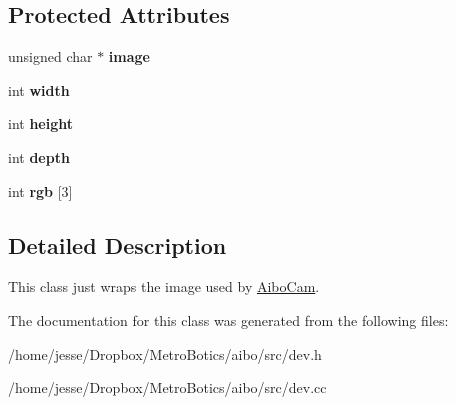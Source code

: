 \subsection*{Protected Attributes}
\begin{DoxyCompactItemize}
\item 
\hypertarget{classdev_a8e333c6cddc88bf779860ea4a3b6520e}{
unsigned char $\ast$ {\bfseries image}}
\label{classdev_a8e333c6cddc88bf779860ea4a3b6520e}

\item 
\hypertarget{classdev_a11d029d54d3705815b303480e6afa550}{
int {\bfseries width}}
\label{classdev_a11d029d54d3705815b303480e6afa550}

\item 
\hypertarget{classdev_a02cfa33ffda59395bd35f7981be4549d}{
int {\bfseries height}}
\label{classdev_a02cfa33ffda59395bd35f7981be4549d}

\item 
\hypertarget{classdev_a917c7f62c2c4c07ab51c2c9b00a9f587}{
int {\bfseries depth}}
\label{classdev_a917c7f62c2c4c07ab51c2c9b00a9f587}

\item 
\hypertarget{classdev_a5292d1ac643cc0fa3413406b5600142e}{
int {\bfseries rgb} \mbox{[}3\mbox{]}}
\label{classdev_a5292d1ac643cc0fa3413406b5600142e}

\end{DoxyCompactItemize}


\subsection{Detailed Description}
This class just wraps the image used by \hyperlink{classAiboCam}{AiboCam}. 

The documentation for this class was generated from the following files:\begin{DoxyCompactItemize}
\item 
/home/jesse/Dropbox/MetroBotics/aibo/src/dev.h\item 
/home/jesse/Dropbox/MetroBotics/aibo/src/dev.cc\end{DoxyCompactItemize}
